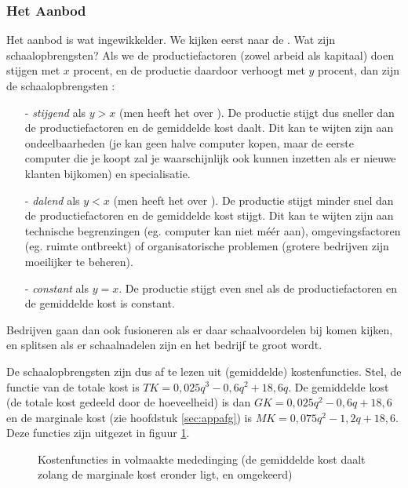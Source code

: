 \subsubsection{Het Aanbod}

Het aanbod is wat ingewikkelder. We kijken eerst naar de . Wat zijn schaalopbrengsten? Als we de productiefactoren (zowel arbeid als kapitaal) doen stijgen met $x$ procent, en de productie daardoor verhoogt met $y$ procent, dan zijn de schaalopbrengsten :
\begin{itemize}
\item[-] \textit{stijgend} als $y>x$ (men heeft het over ). De productie stijgt dus sneller dan de productiefactoren en de gemiddelde kost daalt. Dit kan te wijten zijn aan ondeelbaarheden (je kan geen halve computer kopen, maar de eerste computer die je koopt zal je waarschijnlijk ook kunnen inzetten als er nieuwe klanten bijkomen) en specialisatie.
\item[-] \textit{dalend} als $y<x$ (men heeft het over ). De productie stijgt minder snel dan de productiefactoren en de gemiddelde kost stijgt. Dit kan te wijten zijn aan technische begrenzingen (eg. computer kan niet m\'e\'er aan), omgevingsfactoren (eg. ruimte ontbreekt) of organisatorische problemen (grotere bedrijven zijn moeilijker te beheren).
\item[-] \textit{constant} als $y=x$. De productie stijgt even snel als de productiefactoren en de gemiddelde kost is constant.
\end{itemize}
Bedrijven gaan dan ook fusioneren als er daar schaalvoordelen bij komen kijken, en splitsen als er schaalnadelen zijn en het bedrijf te groot wordt.\\

\par De schaalopbrengsten zijn dus af te lezen uit (gemiddelde) kostenfuncties. Stel, de functie van de totale kost is $TK=0,025q^3-0,6q^2+18,6q$. De gemiddelde kost (de totale kost gedeeld door de hoeveelheid) is dan $GK=0,025q^2-0,6q+18,6$ en de marginale kost (zie hoofdstuk \ref{sec:appafg}) is $MK=0,075q^2-1,2q+18,6$. Deze functies zijn uitgezet in figuur \ref{fig:h3aanbod}.

\begin{figure}[H]
\vspace{0.5cm}
\centering
\captionsetup{justification=centering,margin=2cm}
\caption{Kostenfuncties in volmaakte mededinging (de gemiddelde kost daalt zolang de marginale kost eronder ligt, en omgekeerd)}
\label{fig:h3aanbod}
\end{figure}

